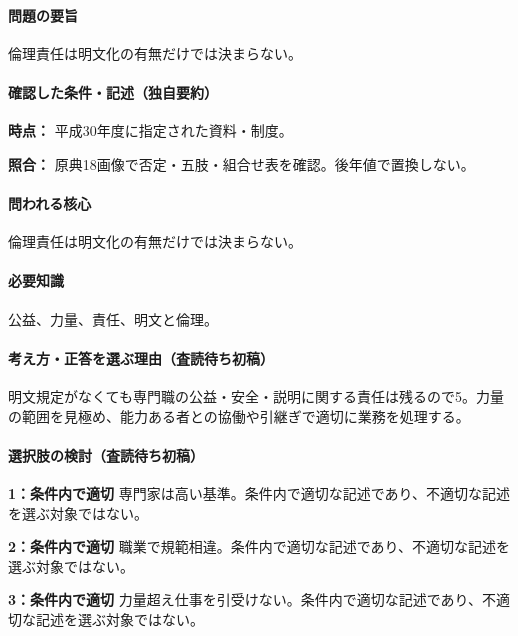 \paragraph{問題の要旨} 倫理責任は明文化の有無だけでは決まらない。

\paragraph{確認した条件・記述（独自要約）}\mbox{}\par

\noindent\textbf{時点：} 平成30年度に指定された資料・制度。\par

\noindent\textbf{照合：} 原典18画像で否定・五肢・組合せ表を確認。後年値で置換しない。\par

\paragraph{問われる核心} 倫理責任は明文化の有無だけでは決まらない。

\paragraph{必要知識} 公益、力量、責任、明文と倫理。

\paragraph{考え方・正答を選ぶ理由（査読待ち初稿）} 明文規定がなくても専門職の公益・安全・説明に関する責任は残るので5。力量の範囲を見極め、能力ある者との協働や引継ぎで適切に業務を処理する。

\paragraph{選択肢の検討（査読待ち初稿）}\mbox{}\par

\noindent\textbf{1：条件内で適切} 専門家は高い基準。条件内で適切な記述であり、不適切な記述を選ぶ対象ではない。\par

\noindent\textbf{2：条件内で適切} 職業で規範相違。条件内で適切な記述であり、不適切な記述を選ぶ対象ではない。\par

\noindent\textbf{3：条件内で適切} 力量超え仕事を引受けない。条件内で適切な記述であり、不適切な記述を選ぶ対象ではない。\par

